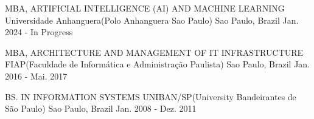 

\begin{cventries}

  \cventry
  {MBA, ARTIFICIAL INTELLIGENCE (AI) AND MACHINE LEARNING} %
  {Universidade Anhanguera(Polo Anhanguera Sao Paulo)} %
  {Sao Paulo, Brazil} %
  {Jan. 2024 - In Progress} %
  {
    \begin{cvitems} %
    \end{cvitems}
  }

  \cventry
    {MBA, ARCHITECTURE AND MANAGEMENT OF IT INFRASTRUCTURE} %
    {FIAP(Faculdade de Informática e Administração Paulista)} %
    {Sao Paulo, Brazil} %
    {Jan. 2016 - Mai. 2017} %
    {
      \begin{cvitems} %
      \end{cvitems}
    }
  
  \cventry
    {BS. IN INFORMATION SYSTEMS} %
    {UNIBAN/SP(University Bandeirantes de São Paulo)} %
    {Sao Paulo, Brazil} %
    {Jan. 2008 - Dez. 2011} %
    {
      \begin{cvitems} %
      \end{cvitems}
    }

\end{cventries}
